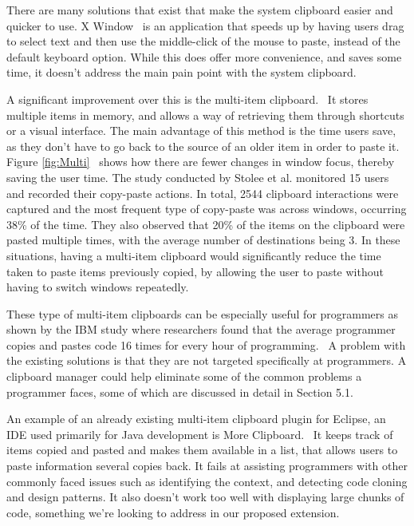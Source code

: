 \documentclass{acm_proc_article-sp}
\begin{document}
There are many solutions that exist that make the system clipboard easier and quicker to use. X Window~\cite{overlapWindow} is an application that speeds up by having users drag to select text and then use the middle-click of the mouse to paste, instead of the default keyboard option. While this does offer more convenience, and saves some time, it doesn't address the main pain point with the system clipboard.

A significant improvement over this is the multi-item clipboard.~\cite{cpHabits} It stores multiple items in memory, and allows a way of retrieving them through shortcuts or a visual interface. The main advantage of this method is the time users save, as they don't have to go back to the source of an older item in order to paste it. Figure \ref{fig:Multi}~\cite{cpHabits} shows how there are fewer changes in window focus, thereby saving the user time. The study conducted by Stolee et al. monitored 15 users and recorded their copy-paste actions. In total, 2544 clipboard interactions were captured and the most frequent type of copy-paste was across windows, occurring 38\% of the time. They also observed that 20\% of the items on the clipboard were pasted multiple times, with the average number of destinations being 3. In these situations, having a multi-item clipboard would significantly reduce the time taken to paste items previously copied, by allowing the user to paste without having to switch windows repeatedly.

These type of multi-item clipboards can be especially useful for programmers as shown by the IBM study where researchers found that the average programmer copies and pastes code 16 times for every hour of programming.~\cite{ooplCP} A problem with the existing solutions is that they are not targeted specifically at programmers. A clipboard manager could help eliminate some of the common problems a programmer faces, some of which are discussed in detail in Section 5.1.

An example of an already existing multi-item clipboard plugin for Eclipse, an IDE used primarily for Java development is More Clipboard.~\cite{moreclipboard} It keeps track of items copied and pasted and makes them available in a list, that allows users to paste information several copies back. It fails at assisting programmers with other commonly faced issues such as identifying the context, and detecting code cloning and design patterns. It also doesn't work too well with displaying large chunks of code, something we're looking to address in our proposed extension.
\end{document}
